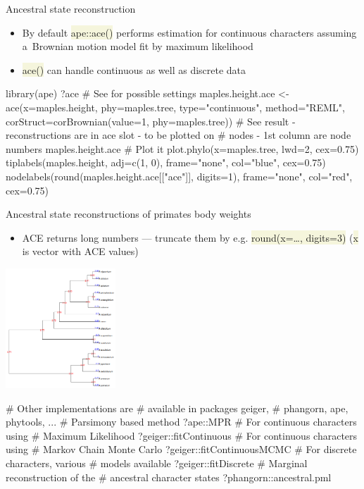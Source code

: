 \documentclass[compress, xelatex, 11pt, xcolor=svgnames, aspectratio=169,
	hyperref={
		bookmarks=true,
		unicode=true,
		colorlinks=true,
		pdftitle={Molecular data in R},
		plainpages=false,
		pdfauthor={Vojtech Zeisek},
		pdfsubject={Course about phylogeny and evolution in R},
		pdfcreator={XeLaTeX},
		pdfkeywords={R, evolution, phylogeny, molecular data},
		linkcolor=Crimson, %
		anchorcolor=Magenta, %
		citecolor=Magenta, %
		filecolor=Magenta, %
		menucolor=Magenta, %
		urlcolor=DodgerBlue, %
		},
	url={hyphens, lowtilde} %
	]{beamer}
\renewcommand{\texttt}[1]{\colorbox{Beige}{{\ttfamily #1}}}
\begin{document}
\begin{frame}[fragile]{Ancestral state reconstruction}
	\begin{itemize}
		\item By default \texttt{ape::ace()} performs estimation for continuous characters assuming a~Brownian motion model fit by maximum likelihood
		\item \texttt{ace()} can handle continuous as well as discrete data
	\end{itemize}
	\begin{spluscode}
    library(ape)
    ?ace # See for possible settings
    maples.height.ace <- ace(x=maples.height, phy=maples.tree,
      type="continuous", method="REML", corStruct=corBrownian(value=1,
      phy=maples.tree))
    # See result - reconstructions are in ace slot - to be plotted on
    # nodes - 1st column are node numbers
    maples.height.ace
    # Plot it
    plot.phylo(x=maples.tree, lwd=2, cex=0.75)
    tiplabels(maples.height, adj=c(1, 0), frame="none", col="blue", cex=0.75)
    nodelabels(round(maples.height.ace[["ace"]], digits=1), frame="none",
      col="red", cex=0.75)
	\end{spluscode}
\end{frame}

\begin{frame}[fragile]{Ancestral state reconstructions of primates body weights}
	\begin{multicols}{2}
		\begin{itemize}
			\item ACE returns long numbers --- truncate them by e.g. \texttt{round(x=\ldots, digits=3)} (\texttt{x} is vector with ACE values)
		\end{itemize}
		\begin{center}
			\includegraphics[height=4.5cm]{ace.png}
		\end{center}
		\begin{spluscode}
    # Other implementations are
    # available in packages geiger,
    # phangorn, ape, phytools, ...
    # Parsimony based method
    ?ape::MPR
    # For continuous characters using
    # Maximum Likelihood
    ?geiger::fitContinuous
    # For continuous characters using
    # Markov Chain Monte Carlo
    ?geiger::fitContinuousMCMC
    # For discrete characters, various
    # models available
    ?geiger::fitDiscrete
    # Marginal reconstruction of the
    # ancestral character states
    ?phangorn::ancestral.pml
		\end{spluscode}
	\end{multicols}
\end{frame}
\end{document}
